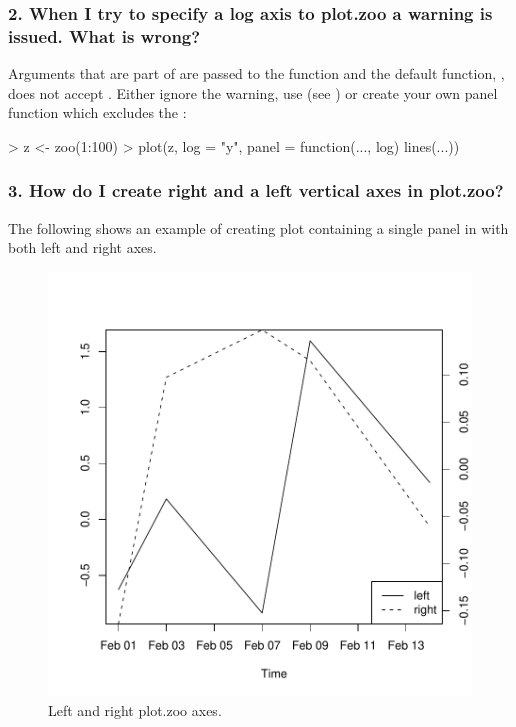 \documentclass{Z}
\newcommand{\mysection}[1]{\subsubsection[#1]{\textbf{#1}}}
\begin{document}
\mysection{2. When I try to specify a log axis to plot.zoo a warning is issued.  What is wrong?}

Arguments that are part of  are passed to the  
function and
the default  function, , does not accept .  
Either 
ignore the warning, use  
(see ) or create
your own panel function which excludes the :

\begin{Schunk}
\begin{Sinput}
> z <- zoo(1:100)
> plot(z, log = "y", panel = function(..., log) lines(...))
\end{Sinput}
\end{Schunk}

\mysection{3. How do I create right and a left vertical axes in plot.zoo?}

The following shows an example of creating plot containing a single
panel in with both left and right axes.  




\begin{figure}[htbp]
\begin{center}
\includegraphics{plot-axes}
\caption{\label{fig:plot-axes} Left and right plot.zoo axes.}
\end{center}
\end{figure}
\end{document}
